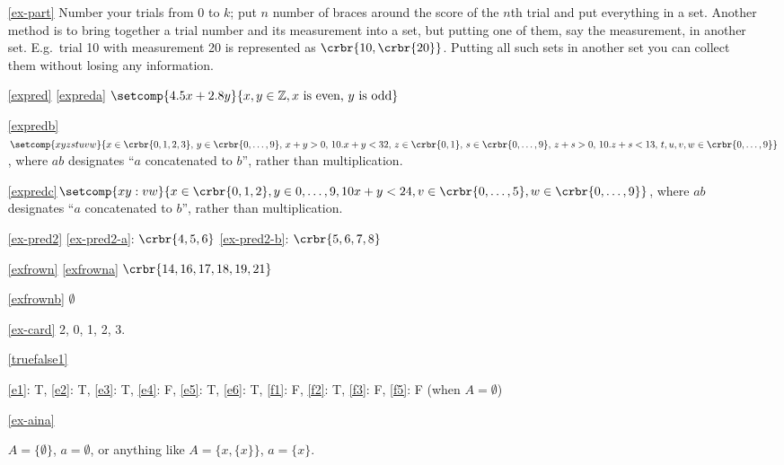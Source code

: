 \documentclass[11pt]{article}
\begin{document}
\begin{enumerate} 

\item[\ref{ex-part}]\hypertarget{ex-part-sol}{} 
Number your trials from 0 to $k$; put $n$
number of braces around the score of the $n$th trial and put everything in a
set. Another method is to bring together a trial number and its measurement into
a set, but putting one of them, say the measurement, in another set. E.g.\ trial
10 with measurement 20 is represented as $\crbr{10,\crbr{20}}$. Putting all such
sets in another set you can collect them without losing any information.

\item[\ref{expred}]\hypertarget{expredsol}{}
\ref{expreda} $\setcomp{4.5x+2.8y}{x,y \in \mathbb{Z}, x \text{ is
even, } y \text{ is odd} }$

\ref{expredb} $\setcomp{xyzstuvw}{x\in
\crbr{0,1,2,3},\,y\in \crbr{0,\ldots,9},\, x+y > 0,\, 10.x+y <32,\, z\in\crbr{0,1},\,
s\in\crbr{0,\ldots,9},\, z+s > 0,\, 10.z+s<13,\, t,u,v,w \in \crbr{0,\ldots,9}}$,
where $ab$ designates ``$a$ concatenated to $b$'', rather than multiplication.

\ref{expredc}$\setcomp{xy:vw}{x \in \crbr{0,1,2}, y\in{0,\ldots,9}, 10x+y < 24, v \in
\crbr{0,\ldots,5}, w\in \crbr{0,\ldots,9}}$,
where $ab$ designates ``$a$ concatenated to $b$'', rather than multiplication.

\item[\ref{ex-pred2}]\hypertarget{ex-pred2-sol}{} 
\ref{ex-pred2-a}: $\crbr{4,5,6}$ 
\ref{ex-pred2-b}: $\crbr{5,6,7,8}$ 

\item[\ref{exfrown}]\hypertarget{exfrownsol}{}
\ref{exfrowna} $\crbr{14,16,17,18,19,21}$	

\ref{exfrownb} $\emptyset$

\item[\ref{ex-card}]\hypertarget{ex-card-sol}{} 2, 0, 1, 2, 3.

\item[\ref{truefalse1}]\hypertarget{truefalse1-sol}{}

\ref{e1}: T, 
\ref{e2}: T, 
\ref{e3}: T, 
\ref{e4}: F, 
\ref{e5}: T, 
\ref{e6}: T, 
\ref{f1}: F, 
\ref{f2}: T, 
\ref{f3}: F, 
\ref{f5}: F (when $A=\emptyset$)

\item[\ref{ex-aina}]\hypertarget{ex-aina-sol}{}

$A=\{ \emptyset\}$, $a=\emptyset$, or anything like $A=\{x,\{ x\}\}$, $a=\{ x\}$.


\end{enumerate}
\end{document}
